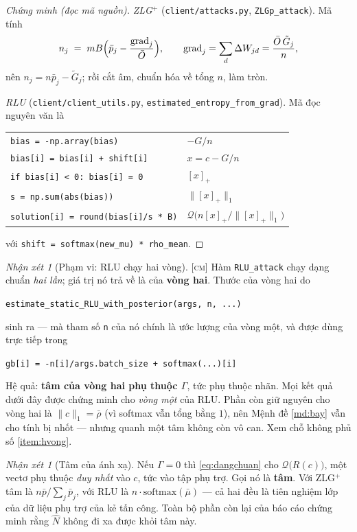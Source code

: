 \documentclass[11pt,a4paper]{article}
\theoremstyle{remark}
\newtheorem{nhanxet}[dinhly]{Nhận xét}
\newcommand{\pos}[1]{\left[#1\right]_+}
\newcommand{\quant}{\mathcal{Q}}
\newcommand{\code}[1]{\texttt{\small #1}}
\begin{document}
\begin{proof}[Chứng minh (đọc mã nguồn)]
\emph{ZLG$^+$} (\code{client/attacks.py}, \code{ZLGp\_attack}). Mã tính
\[
n_j\;=\;mB\Bigl(\bar p_j-\frac{\mathrm{grad}_j}{\bar O}\Bigr),
\qquad
\mathrm{grad}_j=\sum_d\Delta W_{jd}=\frac{\bar O\,\tilde G_j}{n},
\]
nên $n_j=n\bar p_j-\tilde G_j$; rồi cắt âm, chuẩn hóa về tổng $n$, làm tròn.

\emph{RLU} (\code{client/client\_utils.py},
\code{estimated\_entropy\_from\_grad}). Mã đọc nguyên văn là
\begin{center}
\begin{tabular}{@{}ll@{}}
\toprule
\code{bias = -np.array(bias)}             & $-G/n$ \\
\code{bias[i] = bias[i] + shift[i]}       & $x=c-G/n$ \\
\code{if bias[i] < 0: bias[i] = 0}        & $\pos{x}$ \\
\code{s = np.sum(abs(bias))}              & $\|\pos{x}\|_1$ \\
\code{solution[i] = round(bias[i]/s * B)} & $\quant\bigl(n\pos{x}/\|\pos{x}\|_1\bigr)$ \\
\bottomrule
\end{tabular}
\end{center}
với \code{shift = softmax(new\_mu) * rho\_mean}.
\end{proof}

\begin{nhanxet}[Phạm vi: RLU chạy hai vòng]
\label{nx:haivong}
\textsc{[cm]}\; Hàm \code{RLU\_attack} chạy dạng chuẩn \emph{hai lần}; giá
trị nó trả về là của \textbf{vòng hai}. Thước của vòng hai do
\begin{center}
\code{estimate\_static\_RLU\_with\_posterior(args, n, ...)}
\end{center}
sinh ra --- mà tham số \code{n} của nó chính là ước lượng của vòng một, và
được dùng trực tiếp trong
\begin{center}
\code{gb[i] = -n[i]/args.batch\_size + softmax(...)[i]}
\end{center}

Hệ quả: \textbf{tâm của vòng hai phụ thuộc $\Gamma$}, tức phụ thuộc nhãn.
Mọi kết quả dưới đây được chứng minh cho \emph{vòng một} của RLU. Phần còn
giữ nguyên cho vòng hai là $\|c\|_1=\bar\rho$ (vì softmax vẫn tổng bằng $1$),
nên Mệnh đề \ref{md:bay} vẫn cho tính bị nhốt --- nhưng quanh một tâm không
còn vô can. Xem chỗ không phủ số \ref{item:hvong}.
\end{nhanxet}

\begin{nhanxet}[Tâm của ánh xạ]
\label{nx:tam}
Nếu $\Gamma=0$ thì \eqref{eq:dangchuan} cho $\quant\bigl(R(c)\bigr)$, một
vectơ phụ thuộc \emph{duy nhất} vào $c$, tức vào tập phụ trợ. Gọi nó là
\textbf{tâm}. Với ZLG$^+$ tâm là $n\bar p/\sum_j\bar p_j$, với RLU là
$n\cdot\mathrm{softmax}(\bar\mu)$ --- cả hai đều là tiên nghiệm lớp của dữ
liệu phụ trợ của kẻ tấn công. Toàn bộ phần còn lại của báo cáo chứng minh
rằng $\hat N$ không đi xa được khỏi tâm này.
\end{nhanxet}
\end{document}
